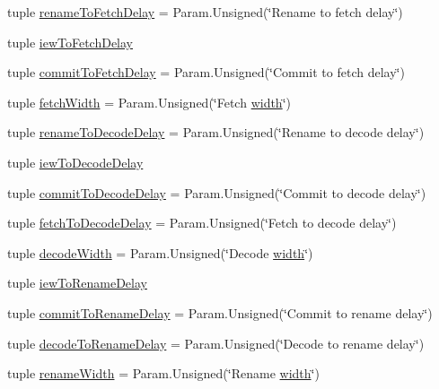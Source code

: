 \begin{DoxyCompactItemize}
\item 
tuple \hyperlink{classOzoneCPU_1_1DerivOzoneCPU_a8aaf587e0c65d740c68328f587f36b97}{renameToFetchDelay} = Param.Unsigned(\char`\"{}Rename to fetch delay\char`\"{})
\item 
tuple \hyperlink{classOzoneCPU_1_1DerivOzoneCPU_a63165fb771c6aa1ecca842abe393a831}{iewToFetchDelay}
\item 
tuple \hyperlink{classOzoneCPU_1_1DerivOzoneCPU_aad1963f659c6e9595b5d1ff499e843d8}{commitToFetchDelay} = Param.Unsigned(\char`\"{}Commit to fetch delay\char`\"{})
\item 
tuple \hyperlink{classOzoneCPU_1_1DerivOzoneCPU_a0a9358767ec7c9dfef70564672b53522}{fetchWidth} = Param.Unsigned(\char`\"{}Fetch \hyperlink{classOzoneCPU_1_1DerivOzoneCPU_a397bb3beea7b21f074bc75e1e71f132f}{width}\char`\"{})
\item 
tuple \hyperlink{classOzoneCPU_1_1DerivOzoneCPU_a4cd25aa163add4667be26df636d1d72d}{renameToDecodeDelay} = Param.Unsigned(\char`\"{}Rename to decode delay\char`\"{})
\item 
tuple \hyperlink{classOzoneCPU_1_1DerivOzoneCPU_a9876f37ad91dd63a32345b53aafbddc6}{iewToDecodeDelay}
\item 
tuple \hyperlink{classOzoneCPU_1_1DerivOzoneCPU_acaab18e678264ee264642b5be0d91157}{commitToDecodeDelay} = Param.Unsigned(\char`\"{}Commit to decode delay\char`\"{})
\item 
tuple \hyperlink{classOzoneCPU_1_1DerivOzoneCPU_a10e1e587508ee15562df112d1142b851}{fetchToDecodeDelay} = Param.Unsigned(\char`\"{}Fetch to decode delay\char`\"{})
\item 
tuple \hyperlink{classOzoneCPU_1_1DerivOzoneCPU_a52dc575e0588181eb7c3bd1e3d803cfd}{decodeWidth} = Param.Unsigned(\char`\"{}Decode \hyperlink{classOzoneCPU_1_1DerivOzoneCPU_a397bb3beea7b21f074bc75e1e71f132f}{width}\char`\"{})
\item 
tuple \hyperlink{classOzoneCPU_1_1DerivOzoneCPU_a54dd22869ae708c0b6bffab65d4d03c5}{iewToRenameDelay}
\item 
tuple \hyperlink{classOzoneCPU_1_1DerivOzoneCPU_a35c9cdaf793827c316dee784cbf39d96}{commitToRenameDelay} = Param.Unsigned(\char`\"{}Commit to rename delay\char`\"{})
\item 
tuple \hyperlink{classOzoneCPU_1_1DerivOzoneCPU_a168896b51e7cc580a9f343e0538ed193}{decodeToRenameDelay} = Param.Unsigned(\char`\"{}Decode to rename delay\char`\"{})
\item 
tuple \hyperlink{classOzoneCPU_1_1DerivOzoneCPU_a6500ae95e23f48433d63280c42925a31}{renameWidth} = Param.Unsigned(\char`\"{}Rename \hyperlink{classOzoneCPU_1_1DerivOzoneCPU_a397bb3beea7b21f074bc75e1e71f132f}{width}\char`\"{})

\end{DoxyCompactItemize}
